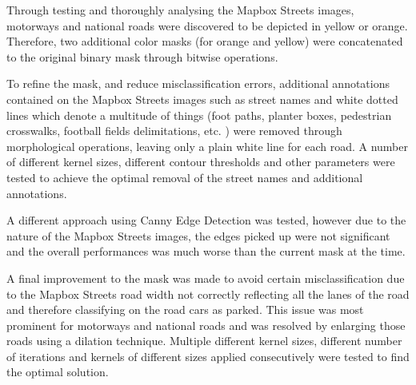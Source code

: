 Through testing and thoroughly analysing the Mapbox Streets images, motorways and national roads were discovered to be depicted in yellow or orange. Therefore, two additional color masks (for orange and yellow) were concatenated to the original binary mask through bitwise operations.

To refine the mask, and reduce misclassification errors, additional annotations contained on the Mapbox Streets images such as street names and white dotted lines which denote a multitude of things (foot paths, planter boxes, pedestrian crosswalks, football fields delimitations, etc. ) were removed through morphological operations, leaving only a plain white line for each road.
A number of different kernel sizes, different contour thresholds and other parameters were tested to achieve the optimal removal of the street names and additional annotations.

A different approach using Canny Edge Detection was tested, however due to the nature of the Mapbox Streets images, the edges picked up were not significant and the overall performances was much worse than the current mask at the time.

A final improvement to the mask was made to avoid certain misclassification due to the Mapbox Streets road width not correctly reflecting all the lanes of the road and therefore classifying on the road cars as parked. This issue was most prominent for motorways and national roads and was resolved by enlarging those roads using a dilation technique. Multiple different kernel sizes, different number of iterations and kernels of different sizes applied consecutively were tested to find the optimal solution.

